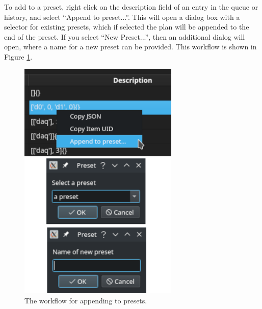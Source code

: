 To add to a preset, right click on the description field of an entry in the queue or history, and select ``Append to preset...''.
This will open a dialog box with a selector for existing presets, which if selected the plan will be appended to the end of the preset.
If you select ``New Preset...'', then an additional dialog will open, where a name for a new preset can be provided.
This workflow is shown in Figure \ref{acq:fig:preset_add}.

\begin{figure}
\includegraphics[width=3in]{"acquisition/images/append_to_preset"}
\caption[Preset add]{
	The workflow for appending to presets.
}
\label{acq:fig:preset_add}
\end{figure}

